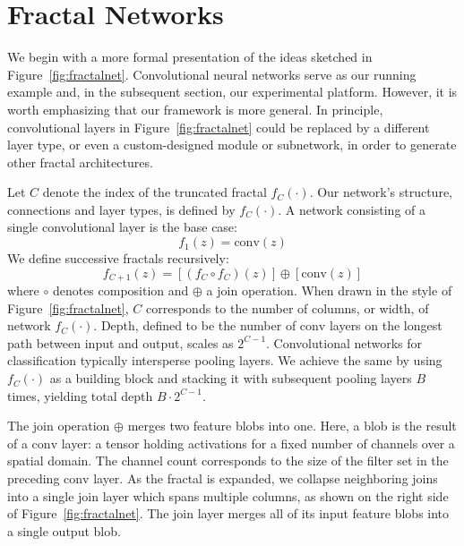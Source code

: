 \documentclass{article}
\begin{document}
\section{Fractal Networks}
\label{sec:method}
We begin with a more formal presentation of the ideas sketched in
Figure~\ref{fig:fractalnet}.  Convolutional neural networks serve as our
running example and, in the subsequent section, our experimental platform.
However, it is worth emphasizing that our framework is more general.  In
principle, convolutional layers in Figure~\ref{fig:fractalnet} could be
replaced by a different layer type, or even a custom-designed module or
subnetwork, in order to generate other fractal architectures.

Let $C$ denote the index of the truncated fractal $f_C(\cdot)$.  Our network's
structure, connections and layer types, is defined by $f_C(\cdot)$.  A network
consisting of a single convolutional layer is the base case:
\begin{equation}
   f_1(z) = \mathrm{conv}(z)
   \label{eq:frac-base}
\end{equation}
We define successive fractals recursively:
\begin{equation}
    f_{C+1}(z) =
      \left[(f_C \circ f_C)(z)\right] \oplus
      \left[\mathrm{conv}(z)\right]
   \label{eq:frac-gen}
\end{equation}
where $\circ$ denotes composition and $\oplus$ a join operation.  When drawn
in the style of Figure~\ref{fig:fractalnet}, $C$ corresponds to the number of
columns, or width, of network $f_C(\cdot)$.  Depth, defined to be the number of
$\mathrm{conv}$ layers on the longest path between input and output, scales as
$2^{C-1}$.  Convolutional networks for classification typically intersperse
pooling layers.  We achieve the same by using $f_C(\cdot)$ as a building block
and stacking it with subsequent pooling layers $B$ times, yielding total depth
$B \cdot 2^{C-1}$.

The join operation $\oplus$ merges two feature blobs into one.  Here, a blob
is the result of a $\mathrm{conv}$ layer: a tensor holding activations for a
fixed number of channels over a spatial domain.  The channel count corresponds
to the size of the filter set in the preceding $\mathrm{conv}$ layer.  As the
fractal is expanded, we collapse neighboring joins into a single
$\mathrm{join}$ layer which spans multiple columns, as shown on the right side
of Figure~\ref{fig:fractalnet}.  The $\mathrm{join}$ layer merges all of its
input feature blobs into a single output blob.
\end{document}
